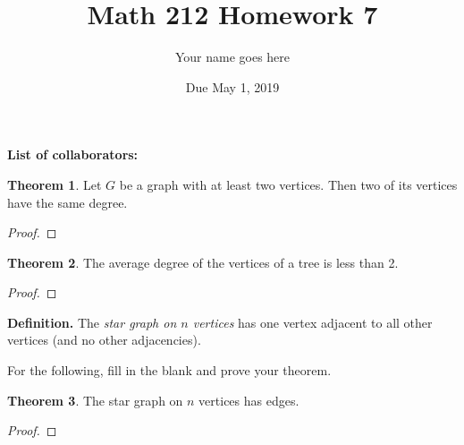 \documentclass[11pt]{article}		%
\title{Math 212 Homework 7}
\author{Your name goes here}
\date{Due May 1, 2019}
\theoremstyle{definition}
\newtheorem{theorem}{Theorem}
\begin{document}
\maketitle

\noindent\textbf{List of collaborators:}



\begin{theorem}
	Let $G$ be a graph with at least two vertices.
	Then two of its vertices have the same degree. %
\end{theorem}


\begin{proof}

\end{proof}



\begin{theorem}
	The average degree of the vertices of a tree is less than 2.
\end{theorem}

\begin{proof}

\end{proof}

\noindent \textbf{Definition.} The \emph{star graph on $n$ vertices} has one vertex adjacent to all other vertices (and no other adjacencies). 

For the following, fill in the blank and prove your theorem.

\begin{theorem}
	The star graph on $n$ vertices has \makebox[0.75in]{\hrulefill} edges. %
\end{theorem}

\begin{proof}

\end{proof}
\end{document}
